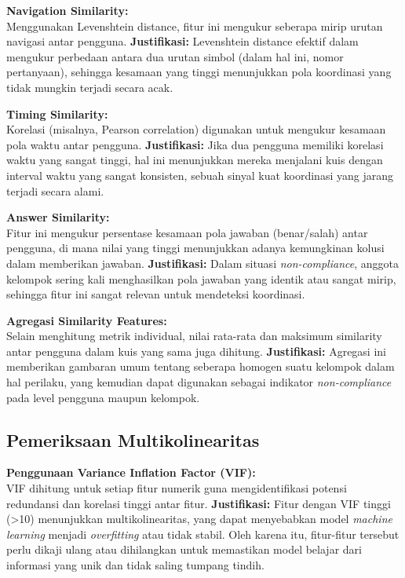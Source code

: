 \textbf{Navigation Similarity:} \\
Menggunakan Levenshtein distance, fitur ini mengukur seberapa mirip urutan navigasi antar pengguna.
\textbf{Justifikasi:} Levenshtein distance efektif dalam mengukur perbedaan antara dua urutan simbol (dalam hal ini, nomor pertanyaan), sehingga kesamaan yang tinggi menunjukkan pola koordinasi yang tidak mungkin terjadi secara acak.

\textbf{Timing Similarity:} \\
Korelasi (misalnya, Pearson correlation) digunakan untuk mengukur kesamaan pola waktu antar pengguna.
\textbf{Justifikasi:} Jika dua pengguna memiliki korelasi waktu yang sangat tinggi, hal ini menunjukkan mereka menjalani kuis dengan interval waktu yang sangat konsisten, sebuah sinyal kuat koordinasi yang jarang terjadi secara alami.

\textbf{Answer Similarity:} \\
Fitur ini mengukur persentase kesamaan pola jawaban (benar/salah) antar pengguna, di mana nilai yang tinggi menunjukkan adanya kemungkinan kolusi dalam memberikan jawaban.
\textbf{Justifikasi:} Dalam situasi \textit{non-compliance}, anggota kelompok sering kali menghasilkan pola jawaban yang identik atau sangat mirip, sehingga fitur ini sangat relevan untuk mendeteksi koordinasi.

\textbf{Agregasi Similarity Features:} \\
Selain menghitung metrik individual, nilai rata-rata dan maksimum similarity antar pengguna dalam kuis yang sama juga dihitung.
\textbf{Justifikasi:} Agregasi ini memberikan gambaran umum tentang seberapa homogen suatu kelompok dalam hal perilaku, yang kemudian dapat digunakan sebagai indikator \textit{non-compliance} pada level pengguna maupun kelompok.

\subsection{Pemeriksaan Multikolinearitas}
\label{sec:pemeriksaanMultikolinearitas}
\textbf{Penggunaan Variance Inflation Factor (VIF):} \\
VIF dihitung untuk setiap fitur numerik guna mengidentifikasi potensi redundansi dan korelasi tinggi antar fitur.
\textbf{Justifikasi:} Fitur dengan VIF tinggi (>10) menunjukkan multikolinearitas, yang dapat menyebabkan model \textit{machine learning} menjadi \textit{overfitting} atau tidak stabil. Oleh karena itu, fitur-fitur tersebut perlu dikaji ulang atau dihilangkan untuk memastikan model belajar dari informasi yang unik dan tidak saling tumpang tindih.

